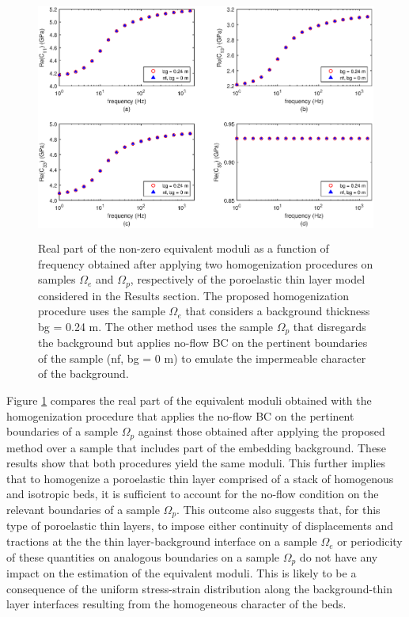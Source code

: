 \documentclass[draft]{agujournal2019}
\begin{document}
\begin{figure}[!ht]
\centering
        \includegraphics[width= 120mm, height=80mm]{cijnf_2sandshaleU.eps}
\caption{Real part of the non-zero equivalent moduli as a function of frequency obtained after applying two homogenization procedures on samples $\Omega_e$ and  $\Omega_p$, respectively of the poroelastic thin layer model considered in the Results section. The proposed homogenization procedure uses the sample $\Omega_e$ that considers a background thickness bg = 0.24 m. The other method uses the sample $\Omega_p$ that disregards the background but applies no-flow BC on the pertinent boundaries of the sample (nf, bg = 0 m) to emulate the impermeable character of the background.}
\label{fig.6}
\end{figure}

Figure \ref{fig.6} compares the real part of the equivalent moduli obtained with the homogenization procedure that applies the no-flow BC on the pertinent boundaries of a sample $\Omega_p$  against those obtained after applying the proposed method over a sample that includes part of the embedding background. These results show that both procedures yield the same moduli. This further implies that to homogenize a poroelastic thin layer comprised of a stack of homogenous and isotropic beds, it is sufficient to account for the no-flow condition on the relevant boundaries of a sample $\Omega_p$. This outcome also suggests that, for this type of poroelastic thin layers, to impose either continuity of displacements and tractions at the the thin layer-background interface on a sample $\Omega_e$ or periodicity of these quantities on analogous boundaries on a sample $\Omega_p$ do not have any impact on the estimation of the equivalent moduli.
This is likely to be a consequence of the uniform stress-strain distribution along the background-thin layer interfaces resulting from the homogeneous character of the beds.
\end{document}
